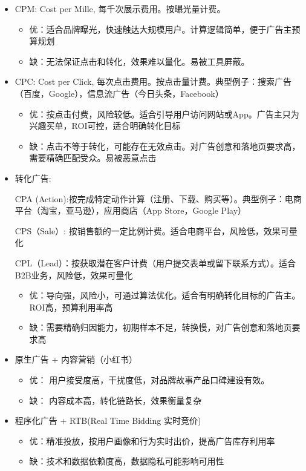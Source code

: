 \documentclass{article}
\begin{document}
\begin{itemize}
    \item CPM: Cost per Mille, 每千次展示费用。按曝光量计费。
    \begin{itemize}
        \item 优：适合品牌曝光，快速触达大规模用户。计算逻辑简单，便于广告主预算规划
        \item 缺：无法保证点击和转化，效果难以量化。易被工具屏蔽。
    \end{itemize}

    \item CPC: Cost per Click, 每次点击费用。按点击量计费。典型例子：搜索广告（百度，Google），信息流广告（今日头条，Facebook）
    \begin{itemize}
        \item 优：按点击付费，风险较低。适合引导用户访问网站或App。广告主只为兴趣买单，ROI可控，适合明确转化目标
        \item 缺：点击不等于转化，可能存在无效点击。对广告创意和落地页要求高，需要精确匹配受众。易被恶意点击
    \end{itemize}

    \item 转化广告:
    
    CPA (Action):按完成特定动作计算（注册、下载、购买等）。典型例子：电商平台（淘宝，亚马逊），应用商店（App Store，Google Play）
    
    CPS（Sale）: 按销售额的一定比例计费。适合电商平台，风险低，效果可量化

    CPL（Lead）：按获取潜在客户计费（用户提交表单或留下联系方式）。适合B2B业务，风险低，效果可量化
    \begin{itemize}
        \item 优：导向强，风险小，可通过算法优化。适合有明确转化目标的广告主。ROI高，预算利用率高
        \item 缺：需要精确归因能力，初期样本不足，转换慢，对广告创意和落地页要求高
    \end{itemize}

    \item 原生广告 + 内容营销（小红书）
    \begin{itemize}
        \item 优： 用户接受度高，干扰度低，对品牌故事产品口碑建设有效。
        \item 缺： 内容成本高，转化链路长，效果衡量复杂
    \end{itemize}

    \item  程序化广告 + RTB(Real Time Bidding 实时竞价)
    \begin{itemize}
        \item 优：精准投放，按用户画像和行为实时出价，提高广告库存利用率
        \item 缺：技术和数据依赖度高，数据隐私可能影响可用性
    \end{itemize}

\end{itemize}
\end{document}
